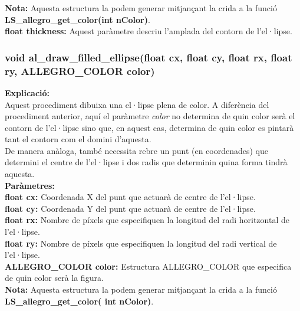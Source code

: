 \documentclass[11pt]{article}
\begin{document}
\noindent \textbf{Nota:} Aquesta estructura la podem generar mitjançant la crida a la funció \textbf{LS\_allegro\_get\_color(int nColor)}.\\

\noindent \textbf{float thickness:} Aquest paràmetre descriu l'amplada del contorn de l'el·lipse.\\

\pagebreak		
\subsubsection{void al\_draw\_filled\_ellipse(float cx, float cy, float rx, float ry, ALLEGRO\_COLOR color)}
\textbf{Explicació:}\\
Aquest procediment dibuixa una el·lipse plena de color. A diferència del procediment anterior, aquí el paràmetre \textit{color} no determina de quin color serà el contorn de l'el·lipse sino que, en aquest cas, determina de quin color es pintarà tant el contorn com el domini d'aquesta.\\
\noindent De manera anàloga, també necessita rebre un punt (en coordenades) que determini el centre de l'el·lipse i dos radis que determinin quina forma tindrà aquesta.\\

\noindent \textbf{Paràmetres:}\\
\textbf{float cx:} Coordenada X del punt que actuarà de centre de l'el·lipse.\\
\textbf{float cy:} Coordenada Y del punt que actuarà de centre de l'el·lipse.\\
\textbf{float rx:} Nombre de píxels que especifiquen la longitud del radi horitzontal de l'el·lipse. \\
\textbf{float ry:} Nombre de píxels que especifiquen la longitud del radi vertical de l'el·lipse.\\
\textbf{ALLEGRO\_COLOR color:} Estructura ALLEGRO\_COLOR que especifica de quin color serà la figura.\\

\noindent \textbf{Nota:} Aquesta estructura la podem generar mitjançant la crida a la funció \textbf{LS\_allegro\_get\_color( int nColor)}.\\
\end{document}
